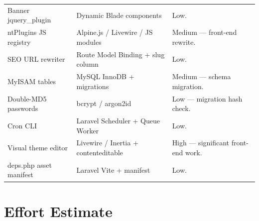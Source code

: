 \documentclass[11pt,a4paper]{article}
\begin{document}
\begin{table}[htbp]
\begin{tabularx}{\columnwidth}{>{\raggedright\arraybackslash}p{4.0cm}>{\raggedright\arraybackslash}p{4.5cm}X}
Banner jquery\_plugin & Dynamic Blade components & Low. \\
ntPlugins JS registry & Alpine.js / Livewire / JS modules & Medium --- front-end rewrite. \\
SEO URL rewriter & Route Model Binding + slug column & Low. \\
MyISAM tables & MySQL InnoDB + migrations & Medium --- schema migration. \\
Double-MD5 passwords & bcrypt / argon2id & Low --- migration hash check. \\
Cron CLI & Laravel Scheduler + Queue Worker & Low. \\
Visual theme editor & Livewire / Inertia + contenteditable & High --- significant front-end work. \\
deps.php asset manifest & Laravel Vite + manifest & Low. \\
\bottomrule
\end{tabularx}
\end{table}

\section{Effort Estimate}\label{sec:effort}
\end{document}
